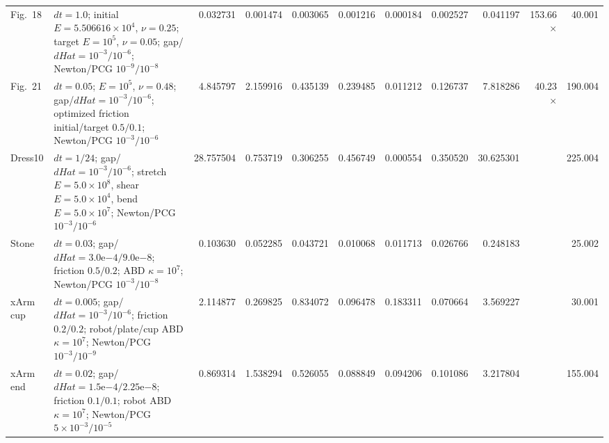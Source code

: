 \documentclass[10pt]{article}
\newcommand{\na}{\text{n/a}}
\newcommand{\speed}[1]{#1$\times$}
\newcommand{\setcell}[1]{\makecell[l]{#1}}
\begin{document}
\begin{table}[htbp]
{\begin{tabular}{l l r r r r r r r r r}
Fig.~18 & \setcell{$dt=1.0$; initial $E=5.506616\times10^{4}$, $\nu=0.25$;\\target $E=10^{5}$, $\nu=0.05$; gap/$dHat=10^{-3}/10^{-6}$;\\Newton/PCG $10^{-9}/10^{-8}$}
& 0.032731 & 0.001474 & 0.003065 & 0.001216 & 0.000184 & 0.002527 & 0.041197 & \speed{153.66} & 40.001 \\
Fig.~21 & \setcell{$dt=0.05$; $E=10^{5}$, $\nu=0.48$;\\gap/$dHat=10^{-3}/10^{-6}$; optimized friction\\initial/target $0.5/0.1$; Newton/PCG $10^{-3}/10^{-6}$}
& 4.845797 & 2.159916 & 0.435139 & 0.239485 & 0.011212 & 0.126737 & 7.818286 & \speed{40.23} & 190.004 \\
Dress10 & \setcell{$dt=1/24$; gap/$dHat=10^{-3}/10^{-6}$;\\stretch $E=5.0\times10^{8}$, shear $E=5.0\times10^{4}$,\\bend $E=5.0\times10^{7}$; Newton/PCG $10^{-3}/10^{-6}$}
& 28.757504 & 0.753719 & 0.306255 & 0.456749 & 0.000554 & 0.350520 & 30.625301 & \na & 225.004 \\
Stone & \setcell{$dt=0.03$; gap/$dHat=3.0\mathrm{e}{-4}/9.0\mathrm{e}{-8}$;\\friction $0.5/0.2$; ABD $\kappa=10^{7}$;\\Newton/PCG $10^{-3}/10^{-8}$}
& 0.103630 & 0.052285 & 0.043721 & 0.010068 & 0.011713 & 0.026766 & 0.248183 & \na & 25.002 \\
xArm cup & \setcell{$dt=0.005$; gap/$dHat=10^{-3}/10^{-6}$;\\friction $0.2/0.2$; robot/plate/cup ABD\\$\kappa=10^{7}$; Newton/PCG $10^{-3}/10^{-9}$}
& 2.114877 & 0.269825 & 0.834072 & 0.096478 & 0.183311 & 0.070664 & 3.569227 & \na & 30.001 \\
xArm end & \setcell{$dt=0.02$; gap/$dHat=1.5\mathrm{e}{-4}/2.25\mathrm{e}{-8}$;\\friction $0.1/0.1$; robot ABD $\kappa=10^{7}$;\\Newton/PCG $5\times10^{-3}/10^{-5}$}
& 0.869314 & 1.538294 & 0.526055 & 0.088849 & 0.094206 & 0.101086 & 3.217804 & \na & 155.004 \\
\bottomrule
\end{tabular}%
}
\end{table}
\end{document}
